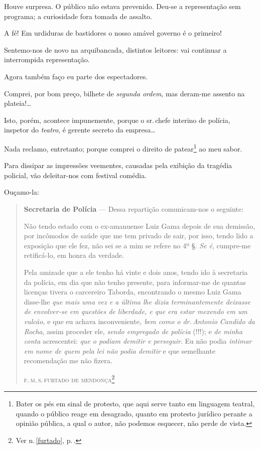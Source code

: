 Houve surpresa. O público não estava prevenido. Deu-se a representação
sem programa; a curiosidade fora tomada de assalto.

A fé! Em urdiduras de bastidores o nosso amável governo é o primeiro!

Sentemo-nos de novo na arquibancada, distintos leitores: vai continuar a
interrompida representação.

Agora também faço eu parte dos espectadores.

Comprei, por bom preço, bilhete de \emph{segunda ordem}, mas deram-me
assento na plateia!\ldots{}

Isto, porém, acontece impunemente, porque o sr.\,chefe interino de
polícia, inspetor do \emph{teatro}, é gerente secreto da empresa\ldots{}

Nada reclamo, entretanto; porque comprei o direito de patear\footnote{
  Bater os pés em sinal de protesto, que aqui serve tanto em linguagem
  teatral, quando o público reage em desagrado, quanto em protesto
  jurídico perante a opinião pública, a qual o autor, não podemos
  esquecer, não perde de vista.} ao meu sabor.

Para dissipar as impressões veementes, causadas pela exibição da
tragédia policial, vão deleitar-nos com festival comédia.

Ouçamo-la:

\begin{quote}
\textbf{Secretaria de Polícia} --- Dessa repartição comunicam-nos o
seguinte:

Não tendo estado com o ex-amanuense Luiz Gama depois de sua demissão,
por incômodos de saúde que me tem privado de sair, por isso, tendo lido
a exposição que ele fez, não sei se a mim se refere no 4º §. \emph{Se
é}, cumpre-me retificá-lo, em honra da verdade.

Pela amizade que a ele tenho há vinte e dois anos, tendo ido à
secretaria da polícia, em dia que não tenho presente, para informar-me
de quantas licenças tivera o carcereiro Taborda, encontrando o mesmo
Luiz Gama disse-lhe \emph{que mais uma vez e a última lhe dizia
terminantemente deixasse de envolver-se em questões de liberdade, e que
era estar mexendo em um vulcão,} e que eu achava inconveniente\emph{,
bem como o dr.\,Antonio Candido da Rocha}, assim proceder ele,
\emph{sendo empregado de polícia} (!!!); e \emph{de minha conta}
acrescentei: \textit{que o podiam demitir e perseguir}. Eu não podia
\emph{intimar em nome de quem pela lei não podia demitir} e que
semelhante recomendação me não fizera.\medskip

\hfill\textsc{f.\,m.\,s.\,furtado de mendonça}\footnote{Ver n.\,\ref{furtado}, p.\,\pageref{furtado}.}
\end{quote}  

